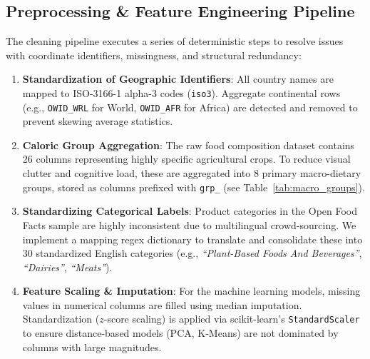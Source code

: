 \documentclass[10pt, a4paper]{article}
\begin{document}
\subsection{Preprocessing \& Feature Engineering Pipeline}
The cleaning pipeline executes a series of deterministic steps to resolve issues with coordinate identifiers, missingness, and structural redundancy:
\begin{enumerate}[nosep, leftmargin=1.5em]
    \item \textbf{Standardization of Geographic Identifiers}: All country names are mapped to ISO-3166-1 alpha-3 codes (\texttt{iso3}). Aggregate continental rows (e.g., \texttt{OWID\_WRL} for World, \texttt{OWID\_AFR} for Africa) are detected and removed to prevent skewing average statistics.
    \item \textbf{Caloric Group Aggregation}: The raw food composition dataset contains 26 columns representing highly specific agricultural crops. To reduce visual clutter and cognitive load, these are aggregated into 8 primary macro-dietary groups, stored as columns prefixed with \texttt{grp\_} (see Table~\ref{tab:macro_groups}).
    \item \textbf{Standardizing Categorical Labels}: Product categories in the Open Food Facts sample are highly inconsistent due to multilingual crowd-sourcing. We implement a mapping regex dictionary to translate and consolidate these into 30 standardized English categories (e.g., \textit{``Plant-Based Foods And Beverages''}, \textit{``Dairies''}, \textit{``Meats''}).
    \item \textbf{Feature Scaling \& Imputation}: For the machine learning models, missing values in numerical columns are filled using median imputation. Standardization ($z$-score scaling) is applied via scikit-learn's \texttt{Standard}\allowbreak\texttt{Scaler} to ensure distance-based models (PCA, K-Means) are not dominated by columns with large magnitudes.
\end{enumerate}
\end{document}
